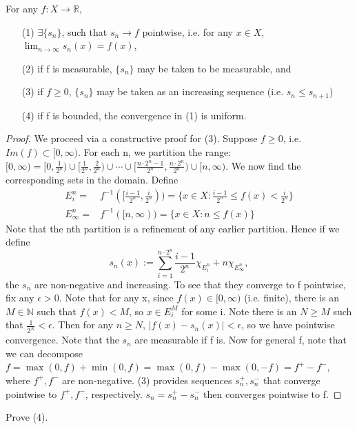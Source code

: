 \documentclass[11pt]{scrartcl}
\begin{document}
\begin{theorem}
For any $f: X \rightarrow \mathbb{R}$,
\begin{itemize}
\item[(1)] $\exists \{s_n\}$, such that $s_n \rightarrow f $ pointwise, i.e. for any $x \in X$, $\lim_{n \rightarrow \infty} s_n(x) = f(x)$,
\item[(2)] if f is measurable, $\{s_n\}$ may be taken to be measurable, and
\item[(3)] if $f \geq 0$, $\{s_n\}$ may be taken as an increasing sequence (i.e. $s_n \leq s_{n+1}$)
\item[(4)] if f is bounded, the convergence in (1) is uniform.
\end{itemize}
\end{theorem}

\begin{proof}
We proceed via a constructive proof for (3). Suppose $f\geq 0$, i.e. $Im(f) \subset [0,\infty)$. For each n, we partition the range: $[0,\infty) = [0,\frac{1}{2^n})\cup [\frac{1}{2^n},\frac{2}{2^n}) \cup \cdots \cup [\frac{n\cdot 2^n -1}{2^n},\frac{n\cdot 2^n}{2^n})\cup [n,\infty)$. We now find the corresponding sets in the domain. Define
\begin{align*}
E_i^n =& f^{-1}([\frac{i-1}{2^n},\frac{i}{2^n})) = \{x\in X: \frac{i-1}{2^n}\leq f(x) < \frac{i}{2^n}\}\\
E_\infty^n = & f^{-1}([n,\infty)) = \{x\in X: n \leq f(x)\}
\end{align*}
Note that the nth partition is a refinement of any earlier partition. Hence if we define 
$$ s_n(x) := \sum_{i=1}^{n\cdot 2^n} \frac{i-1}{2^n} \chi_{E_i^n} + n \chi_{E_\infty^n},$$
the $s_n$ are non-negative and increasing. To see that they converge to f pointwise, fix any $\epsilon>0$. Note that for any x, since $f(x)\in[0,\infty)$ (i.e. finite), there is an $M \in \mathbb{N}$ such that $f(x) < M$, so $x\in E_i^M$ for some i. Note there is an $N\geq M$ such that $\frac{1}{2^N}<\epsilon$. Then for any $n\geq N$, $|f(x)-s_n(x)|<\epsilon$, so we have pointwise convergence.
Note that the $s_n$ are measurable if f is.
Now for general f, note that we can decompose $f = \max(0,f) + \min(0,f)= \max(0,f) - \max(0,-f) = f^+ - f^- $, where $f^+,f^-$ are non-negative. (3) provides sequences $s_n^+,s_n^-$ that converge pointwise to $f^+,f^-$, respectively. $s_n = s_n^+ - s_n^-$ then converges pointwise to f. 
\end{proof} 

\begin{exercise}
Prove (4).
\end{exercise}
\end{document}
